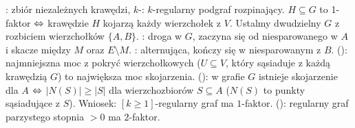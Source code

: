 :  zbiór niezależnych krawędzi, $k$-: $k$-regularny podgraf rozpinający.
$H \subseteq G$ to 1-faktor $\Leftrightarrow$ krawędzie $H$ kojarzą każdy wierzchołek z $V$.
Ustalmy dwudzielny $G$ z rozbiciem wierzchołków $\{A, B\}$. 
: droga w $G$, zaczyna się od niesparowanego w $A$ i skacze między $M$ oraz $E \setminus M$.
: alternująca, kończy się w niesparowanym z $B$.
 (): najmniejszna moc z pokryć wierzchołkowych ($U \subseteq V$, który sąsiaduje z każdą krawędzią $G$) to największa moc skojarzenia.
 (): w grafie $G$ istnieje skojarzenie dla $A$ $\Leftrightarrow$ $|N(S)| \ge |S|$ dla wierzchozbiorów $S \subseteq A$ ($N(S)$ to punkty sąsiadujące z $S$). 
Wniosek: $[k \ge 1]$-regularny graf ma $1$-faktor.
 (): regularny graf parzystego stopnia $> 0$ ma $2$-faktor.
